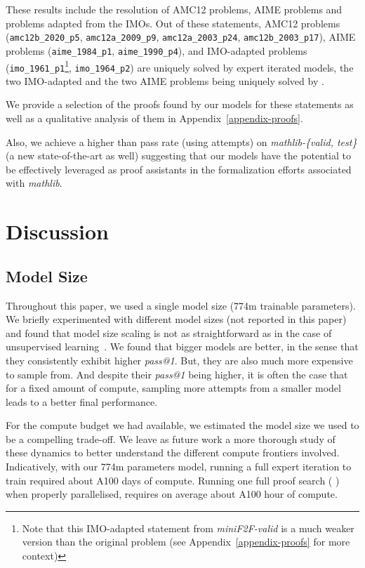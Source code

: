 \documentclass[nohyperref]{article}
\theoremstyle{plain}
\theoremstyle{definition}
\theoremstyle{remark}
\begin{document}
These results include the resolution of  AMC12 problems,  AIME problems and  problems adapted from the IMOs. Out of these statements,  AMC12 problems (\verb|amc12b_2020_p5|, \verb|amc12a_2009_p9|, \verb|amc12a_2003_p24|, \verb|amc12b_2003_p17|),  AIME problems (\verb|aime_1984_p1|, \verb|aime_1990_p4|), and  IMO-adapted problems (\verb|imo_1961_p1|\footnote{Note that this IMO-adapted statement from \textit{miniF2F-valid} is a much weaker version than the original problem (see Appendix~\ref{appendix-proofs} for more context)}, \verb|imo_1964_p2|) are uniquely solved by expert iterated models, the two IMO-adapted and the two AIME problems being uniquely solved by . 

We provide a selection of the proofs found by our models for these statements as well as a qualitative analysis of them in Appendix~\ref{appendix-proofs}.

Also, we achieve a higher than  pass rate (using  attempts) on \textit{mathlib-\{valid, test\}} (a new state-of-the-art as well) suggesting that our models have the potential to be effectively leveraged as proof assistants in the formalization efforts associated with \textit{mathlib}.


\section{Discussion}

\subsection{Model Size}

Throughout this paper, we used a single model size (774m trainable parameters). We briefly experimented with different model sizes (not reported in this paper) and found that model size scaling is not as straightforward as in the case of unsupervised learning~\cite{kaplan2020scaling}. We found that bigger models are better, in the sense that they consistently exhibit higher \textit{pass@1}. But, they are also much more expensive to sample from. And despite their \textit{pass@1} being higher, it is often the case that for a fixed amount of compute, sampling more attempts from a smaller model leads to a better final performance.

For the compute budget we had available, we estimated the model size we used to be a compelling trade-off. We leave as future work a more thorough study of these dynamics to better understand the different compute frontiers involved. Indicatively, with our 774m parameters model, running a full expert iteration to train  required about  A100 days of compute. Running one full proof search (  ) when properly parallelised, requires on average about  A100 hour of compute.
\end{document}
